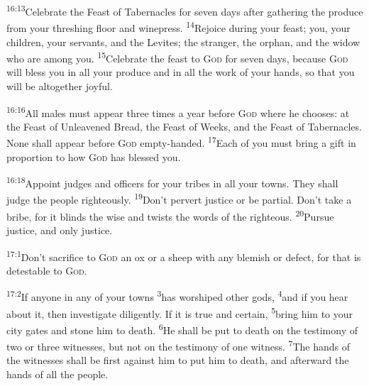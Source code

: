 \documentclass[openany,12pt,english]{book}
\newenvironment{para}{\par\pretolerance=100\tolerance=200\setlength{\emergencystretch}{0.6em}\relax}{\par}
\begin{document}
\begin{para}
    \textsuperscript{16:13}\thinspace{}Cel\-e\-brate the Feast of Tabernacles for sev\-en days af\-ter gath\-er\-ing the pro\-duce from your threshing floor and wine\-press.
    \textsuperscript{14}\thinspace{}Re\-joice dur\-ing your feast; you, your chil\-dren, your servants, and the Levites; the strang\-er, the or\-phan, and the wid\-ow who are a\-mong you.
    \textsuperscript{15}\thinspace{}Cel\-e\-brate the feast to \textsc{God} for sev\-en days, be\-cause \textsc{God} will bless you in all your pro\-duce and in all the work of your hands, so that you will be al\-to\-geth\-er joy\-ful.
\end{para}

\begin{para}
    \textsuperscript{16:16}\thinspace{}All males must ap\-pear three times a year be\-fore \textsc{God} where he chooses: at the Feast of Un\-leav\-ened Bread, the Feast of Weeks, and the Feast of Tabernacles. None shall ap\-pear be\-fore \textsc{God} empty-handed.
    \textsuperscript{17}\thinspace{}Each of you must bring a gift in pro\-por\-tion to how \textsc{God} has bless\-ed you.
\end{para}

\begin{para}
    \textsuperscript{16:18}\thinspace{}Ap\-point judges and officers for your tribes in all your towns. They shall judge the peo\-ple right\-eous\-ly.
    \textsuperscript{19}\thinspace{}Don't per\-vert jus\-tice or be par\-tial. Don't take a bribe, for it blinds the wise and twists the words of the right\-eous.
    \textsuperscript{20}\thinspace{}Pur\-sue jus\-tice, and on\-ly jus\-tice.
\end{para}

\bigskip{}

\begin{para}
    \textsuperscript{17:1}\thinspace{}Don't sac\-ri\-fice to \textsc{God} an ox or a sheep with any blem\-ish or de\-fect, for that is de\-test\-a\-ble to \textsc{God}.
\end{para}

\begin{para}
    \textsuperscript{17:2}\thinspace{}If any\-one in any of your towns
    \textsuperscript{3}\thinspace{}has wor\-shiped oth\-er gods,
    \textsuperscript{4}\thinspace{}and if you hear a\-bout it, then in\-ves\-ti\-gate dil\-i\-gent\-ly. If it is true and cer\-tain,
    \textsuperscript{5}\thinspace{}bring him to your cit\-y gates and stone him to death.
    \textsuperscript{6}\thinspace{}He shall be put to death on the tes\-ti\-mo\-ny of two or three witnesses, but not on the tes\-ti\-mo\-ny of one wit\-ness.
    \textsuperscript{7}\thinspace{}The hands of the witnesses shall be first a\-gainst him to put him to death, and af\-ter\-ward the hands of all the peo\-ple.
\end{para}
\end{document}
